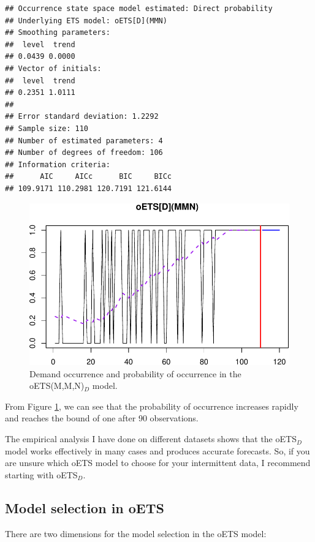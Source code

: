 \documentclass[
]{book}
\theoremstyle{definition}
\theoremstyle{definition}
\theoremstyle{definition}
\theoremstyle{definition}
\theoremstyle{remark}
\begin{document}
\begin{verbatim}
## Occurrence state space model estimated: Direct probability
## Underlying ETS model: oETS[D](MMN)
## Smoothing parameters:
##  level  trend 
## 0.0439 0.0000 
## Vector of initials:
##  level  trend 
## 0.2351 1.0111 
## 
## Error standard deviation: 1.2292
## Sample size: 110
## Number of estimated parameters: 4
## Number of degrees of freedom: 106
## Information criteria: 
##      AIC     AICc      BIC     BICc 
## 109.9171 110.2981 120.7191 121.6144
\end{verbatim}

\begin{figure}
\centering
\includegraphics{Svetunkov--2022----ADAM_files/figure-latex/oETSDModel-1.pdf}
\caption{\label{fig:oETSDModel}Demand occurrence and probability of occurrence in the oETS(M,M,N)\(_D\) model.}
\end{figure}

From Figure \ref{fig:oETSDModel}, we can see that the probability of occurrence increases rapidly and reaches the bound of one after 90 observations.

The empirical analysis I have done on different datasets shows that the oETS\(_D\) model works effectively in many cases and produces accurate forecasts. So, if you are unsure which oETS model to choose for your intermittent data, I recommend starting with oETS\(_D\).

\hypertarget{oETSModelSelection}{%
\subsection{Model selection in oETS}\label{oETSModelSelection}}

There are two dimensions for the model selection in the oETS model:
\end{document}
